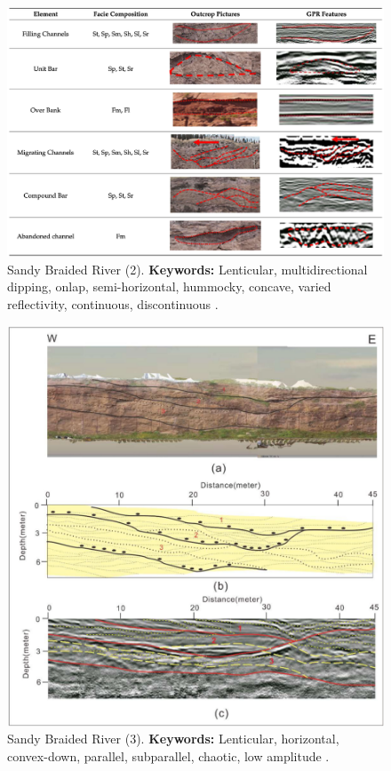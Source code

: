 \begin{figure}[h!]
    \centering
    \includegraphics[width=0.9\linewidth]{Figures/0.2GPR/Guo2022_6.png}
    \caption[Sandy Braided River (2).]{Sandy Braided River (2). \textbf{Keywords: } Lenticular, multidirectional dipping, onlap, semi-horizontal, hummocky, concave, varied reflectivity, continuous, discontinuous \citep{Guo2022}.}
    \label{fig:Guo2022-6}
\end{figure}

\begin{figure}[h!]
    \centering
    \includegraphics[width=0.9\linewidth]{Figures/0.2GPR/Guo2022_5.png}
    \caption[Sandy Braided River (3).]{Sandy Braided River (3). \textbf{Keywords:} Lenticular, horizontal, convex-down, parallel, subparallel, chaotic, low amplitude \citep{Guo2022}.}
    \label{fig:Guo2022-5}
\end{figure}


